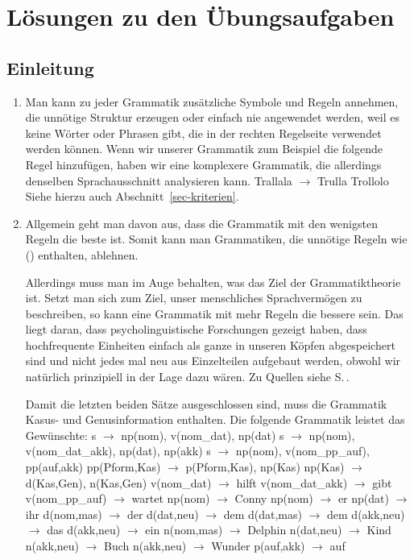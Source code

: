 
\chapter{Lösungen zu den Übungsaufgaben}

\section{Einleitung}


\begin{enumerate}
\item Man kann zu jeder Grammatik zusätzliche Symbole und Regeln annehmen, die unnötige Struktur
  erzeugen oder einfach nie angewendet werden, weil es keine Wörter oder Phrasen gibt, die in der
  rechten Regelseite verwendet werden können. Wenn wir unserer Grammatik zum Beispiel die folgende
  Regel hinzufügen, haben wir eine komplexere Grammatik, die allerdings denselben Sprachausschnitt
  analysieren kann.
\ea
Trallala $\to$ Trulla Trollolo
\z
Siehe hierzu auch Abschnitt~\ref{sec-kriterien}.
\item Allgemein geht man davon aus, dass die Grammatik mit den wenigsten Regeln die beste ist. Somit
  kann man Grammatiken, die unnötige Regeln wie () enthalten, ablehnen.

Allerdings muss man im Auge behalten, was das Ziel der Grammatiktheorie ist. Setzt man sich zum Ziel,
unser menschliches Sprachvermögen zu beschreiben, so kann eine Grammatik mit mehr Regeln die bessere
sein. Das liegt daran, dass psycholinguistische Forschungen gezeigt haben, dass hochfrequente
Einheiten einfach als ganze in unseren Köpfen abgespeichert sind und nicht jedes mal neu aus
Einzelteilen aufgebaut werden, obwohl wir natürlich prinzipiell in der Lage dazu wären. Zu Quellen
siehe S.\,\pageref{page-gespeicherte-Chunks}.

Damit die letzten beiden Sätze ausgeschlossen sind, muss die Grammatik Kasus- und Genusinformation
enthalten. Die folgende Grammatik leistet das Gewünschte:
\eal
\ex s $\to$ np(nom), v(nom\_dat), np(dat)
\ex s $\to$ np(nom), v(nom\_dat\_akk), np(dat), np(akk)
\ex s $\to$ np(nom), v(nom\_pp\_auf), pp(auf,akk)
%
\ex pp(Pform,Kas) $\to$ p(Pform,Kas), np(Kas)
\ex np(Kas) $\to$ d(Kas,Gen), n(Kas,Gen)
%
\ex v(nom\_dat) $\to$ hilft
\ex v(nom\_dat\_akk) $\to$ gibt
\ex v(nom\_pp\_auf) $\to$ wartet
%
\ex np(nom) $\to$ Conny
\ex np(nom) $\to$ er
\ex np(dat) $\to$ ihr
%
\ex d(nom,mas) $\to$ der
\ex d(dat,neu) $\to$ dem
\ex d(dat,mas) $\to$ dem
\ex d(akk,neu) $\to$ das
\ex d(akk,neu) $\to$ ein
%
\ex n(nom,mas) $\to$ Delphin
\ex n(dat,neu) $\to$ Kind
\ex n(akk,neu) $\to$ Buch
\ex n(akk,neu) $\to$ Wunder
%
\ex p(auf,akk) $\to$ auf
\zl




\end{enumerate}
